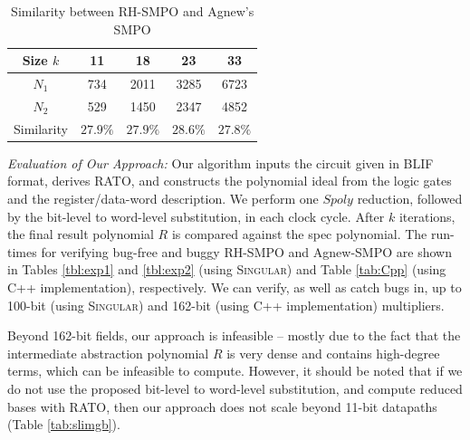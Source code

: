 \begin{table}[bp]
\centering
\caption{\small Similarity between RH-SMPO and Agnew's SMPO}
\label{tbl:fraig}
\begin{tabular}{|c||c|c|c|c|} 
\hline
Size $k$ & 11 & 18 & 23 & 33 \\
\hline
$N_1$ & 734  & 2011  & 3285  & 6723\\
\hline
$N_2$ & 529 & 1450 & 2347 & 4852\\
\hline
Similarity & $27.9\%$ & $27.9\%$ & $28.6\%$ & $27.8\%$  \\
\hline
\end{tabular}\label{table:similarity}  
\end{table} 

{\it Evaluation of Our Approach:} Our algorithm inputs the circuit
given in BLIF format, derives RATO, and constructs the polynomial
ideal from the logic gates and the register/data-word description.  We
perform one $Spoly$ reduction, followed by the bit-level to word-level 
substitution, in each clock cycle. After $k$ iterations, the final
result polynomial $R$ is compared against the spec polynomial. The
run-times for verifying bug-free and buggy RH-SMPO and Agnew-SMPO are
shown in Tables \ref{tbl:exp1} and \ref{tbl:exp2} (using \textsc{Singular})
and Table \ref{tab:Cpp} (using C++ implementation), respectively. 
We can verify, as well as catch bugs in, up to 100-bit (using \textsc{Singular})
and 162-bit (using C++ implementation) multipliers. 

Beyond 162-bit fields, our approach is infeasible --
mostly due to the fact that the intermediate 
abstraction polynomial $R$ is very dense and contains high-degree
terms, which can be infeasible to compute. However, it should be noted
that if we do not use the proposed bit-level to word-level
substitution, and compute reduced \Grobner bases with RATO, then our
approach does not scale beyond 11-bit datapaths (Table \ref{tab:slimgb}). 

